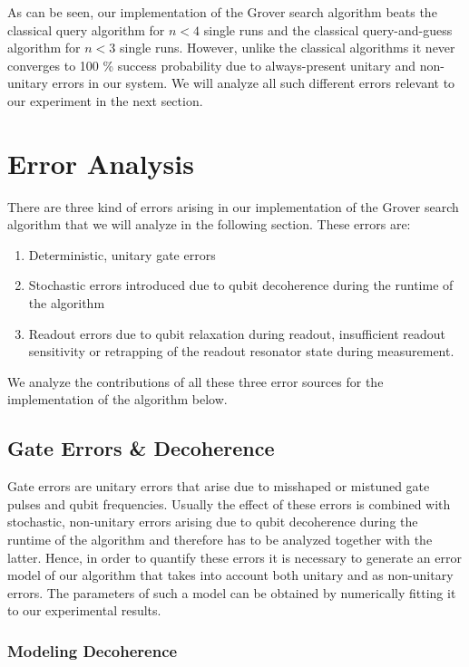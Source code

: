 As can be seen, our implementation of the Grover search algorithm beats the classical query algorithm for $n<4$ single runs and the classical query-and-guess algorithm for $n<3$ single runs. However, unlike the classical algorithms it never converges to 100 \% success probability due to always-present unitary and non-unitary errors in our system. We will analyze all such different errors relevant to our experiment in the next section.

\section{Error Analysis}

There are three kind of errors arising in our implementation of the Grover search algorithm that we will analyze in the following section. These errors are:

\begin{enumerate}
	\item Deterministic, unitary gate errors
	\item Stochastic errors introduced due to qubit decoherence during the runtime of the algorithm
	\item Readout errors due to qubit relaxation during readout, insufficient readout sensitivity or retrapping of the readout resonator state during measurement.
\end{enumerate}

We analyze the contributions of all these three error sources for the implementation of the algorithm below.

\subsection{Gate Errors \& Decoherence}

Gate errors are unitary errors that arise due to misshaped or mistuned gate pulses and qubit frequencies. Usually the effect of these errors is combined with stochastic, non-unitary errors arising due to qubit decoherence during the runtime of the algorithm and therefore has to be analyzed together with the latter. Hence, in order to quantify these errors it is necessary to generate an error model of our algorithm that takes into account both unitary and as non-unitary errors. The parameters of such a model can be obtained by numerically fitting it to our experimental results. 

\subsubsection{Modeling Decoherence}

